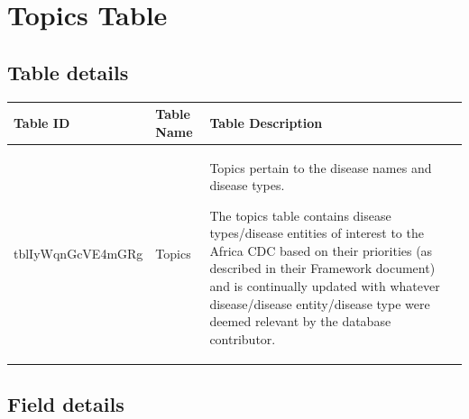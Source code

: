 \documentclass[
]{book}
\begin{document}
\hypertarget{topics-table}{%
\section{Topics Table}\label{topics-table}}

\hypertarget{table-details-9}{%
\subsection{Table details}\label{table-details-9}}

\begin{table}
\centering
\begin{tabular}{l|l|l}
\hline
\textbf{Table ID} & \textbf{Table Name} & \textbf{Table Description}\\
\hline
tblIyWqnGcVE4mGRg & Topics & Topics pertain to the disease names and disease types. 

The topics table contains disease types/disease entities of interest to the Africa CDC based on their priorities (as described in their Framework document) and is continually updated with whatever disease/disease entity/disease type were deemed relevant by the database contributor.\\
\hline
\end{tabular}
\end{table}

\hypertarget{field-details-6}{%
\subsection{Field details}\label{field-details-6}}
\end{document}
